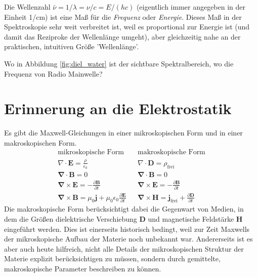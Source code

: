 Die Wellenzahl $\bar{\nu} = 1 / \lambda =\nu / c =  E / (h c)$ (eigentlich immer angegeben in der Einheit 1/cm) ist eine Maß für die  \emph{Frequenz} oder \emph{Energie}. Dieses Maß in der Spektroskopie sehr weit verbreitet ist, weil es proportional zur Energie ist (und damit das Reziproke der Wellenlänge umgeht), aber gleichzeitig nahe an der praktischen, intuitiven Größe 'Wellenlänge'.



\begin{questions} 
\item Wo in  Abbildung  \ref{fig:diel_water} ist der sichtbare Spektralbereich, wo die Frequenz von Radio Mainwelle?
\end{questions}


\section{Erinnerung an die Elektrostatik }

Es gibt die Maxwell-Gleichungen in einer mikroskopischen Form und in einer makroskopischen Form.
%
\begin{align}
\text{mikroskopische Form} & &
\text{makroskopische Form} \nonumber \\
%
 \nabla\cdot\mathbf{E}= \frac{\rho}{\epsilon_0} & &
 \nabla\cdot\mathbf{D}= \rho_{\text{frei}} \\
%
\mathbf\nabla\cdot\mathbf{B}=0
 & &
\mathbf\nabla\cdot\mathbf{B}=0 \\
%
\mathbf\nabla\times\mathbf{E}=-\frac{\partial\mathbf{B}}{\partial t}  
& &
\mathbf\nabla\times\mathbf{E}=-\frac{\partial\mathbf{B}}{\partial t} \\
%
\mathbf\nabla\times\mathbf{B}= \mu_0\mathbf{j}+\mu_0\epsilon_0\frac{\partial\mathbf{E}}{\partial t}  & &
\mathbf\nabla\times\mathbf{H}= \mathbf{j}_{\text{frei}}+\frac{\partial\mathbf{D}}{\partial t}
\end{align}
%
Die makroskopische Form berücksichtigt dabei die Gegenwart von Medien, in dem die Größen dielektrische Verschiebung $\mathbf{D}$ und magnetische Feldstärke $\mathbf{H}$ eingeführt werden. Dies ist einerseits historisch bedingt, weil zur Zeit Maxwells der mikroskopische Aufbau der Materie noch unbekannt war. Andererseits ist es aber auch heute hilfreich, nicht alle Details der mikroskopischen Struktur der Materie explizit berücksichtigen zu müssen, sondern durch gemittelte, makroskopische Parameter beschreiben zu können.

